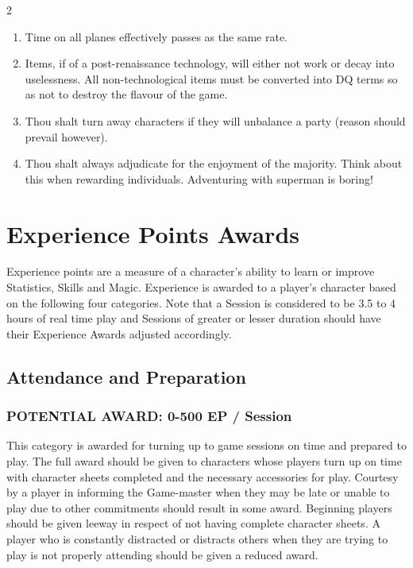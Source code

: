 \documentclass{article}
\begin{document}
\begin{multicols}{2}
\begin{enumerate}
\item
Time on all planes effectively passes as the same rate.

\item
Items, if of a post-renaissance technology, will either not work or
decay into uselessness. All non-technological items must be converted
into DQ terms so as not to destroy the flavour of the game.

\item
Thou shalt turn away characters if they will unbalance a party (reason
should prevail however).

\item
Thou shalt always adjudicate for the enjoyment of the majority.  Think
about this when rewarding individuals.  Adventuring with superman is
boring!

\end{enumerate}

\newpage

\section{Experience Points Awards}

Experience points are a measure of a character's ability to learn or
improve Statistics, Skills and Magic.  Experience is awarded to a
player's character based on the following four categories. Note that a
Session is considered to be 3.5 to 4 hours of real time play and
Sessions of greater or lesser duration should have their Experience
Awards adjusted accordingly.

\subsection{Attendance and Preparation}

\subsubsection{POTENTIAL AWARD: 0-500 EP / Session}

This category is awarded for turning up to game sessions on time and
prepared to play.  The full award should be given to characters whose
players turn up on time with character sheets completed and the
necessary accessories for play.  Courtesy by a player in informing the
Game-master when they may be late or unable to play due to other
commitments should result in some award.  Beginning players should be
given leeway in respect of not having complete character sheets.  A
player who is constantly distracted or distracts others when they are
trying to play is not properly attending should be given a reduced
award.


\end{multicols}
\end{document}
